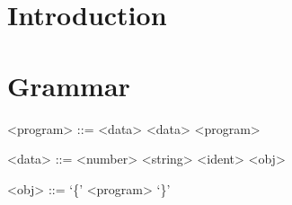

\MYHEADERS{}
\tableofcontents
\vfill
\pagebreak
\section{Introduction}
\section{Grammar}
\begin{grammar}
<program> ::= <data>
\alt <data> <program>

<data> ::= <number>
	\alt <string> 
	\alt <ident>
	\alt <obj>
	
<obj> ::= `\{'  <program> `\}'
\end{grammar}



